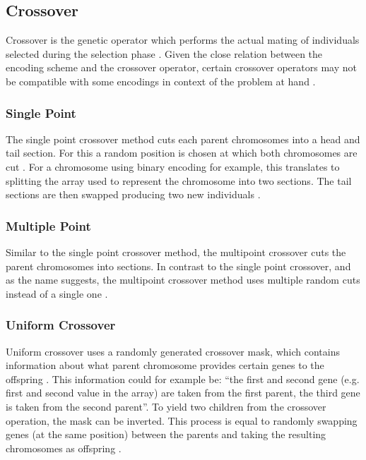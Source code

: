 \documentclass[sigconf]{acmart}
\begin{document}


\subsection{Crossover}
Crossover is the genetic operator which performs the actual mating of
individuals selected during the selection phase \cite{Beligiannis2009}.
Given the close relation between the encoding scheme and the crossover operator,
certain crossover operators may not be compatible with some encodings in context
of the problem at hand \cite{Affenzeller2009}.

\subsubsection{Single Point}
The single point crossover method cuts each parent chromosomes into a head and
tail section. For this a random position is chosen at which both chromosomes
are cut \cite{Affenzeller2009}.
For a chromosome using binary encoding for example, this translates to
splitting the array used to represent the chromosome into two sections.
The tail sections are then swapped producing two new individuals
\cite{Affenzeller2009}.

\subsubsection{Multiple Point}
Similar to the single point crossover method, the multipoint crossover
cuts the parent chromosomes into sections. In contrast to the single point
crossover, and as the name suggests, the multipoint crossover method
uses multiple random cuts instead of a single one
\cite{Affenzeller2009,Katoch2021}. 

\subsubsection{Uniform Crossover}
Uniform crossover uses a randomly generated crossover mask, which contains
information about what parent chromosome provides certain genes to the
offspring \cite{Affenzeller2009}. This information could for example be:
\enquote{the first and second gene (e.g. first and second value in the array)
are taken from the first parent, the third gene is taken from the second
parent}.
To yield two children from the crossover operation, the mask can be inverted.
This process is equal to randomly swapping genes (at the same position) between
the parents and taking the resulting chromosomes as offspring \cite{Katoch2021}.
\end{document}
